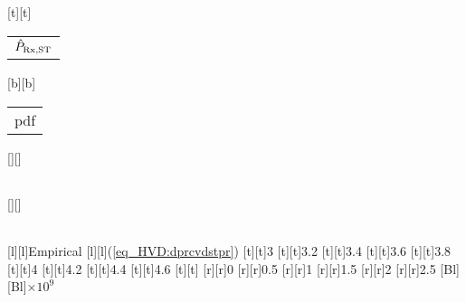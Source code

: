%    
%
%
%
[t][t]{\fontsize{8}{12}\selectfont \color[rgb]{0.15,0.15,0.15}\setlength{\tabcolsep}{0pt}\begin{tabular}{c}$\hat{P}_{\text{Rx,ST}}$\end{tabular}}%
[b][b]{\fontsize{8}{12}\selectfont \color[rgb]{0,0,0}\setlength{\tabcolsep}{0pt}\begin{tabular}{c}pdf\end{tabular}}%
[][]{\fontsize{10}{15}\selectfont \color[rgb]{0,0,0}\setlength{\tabcolsep}{0pt}\begin{tabular}{c} \end{tabular}}%
[][]{\fontsize{10}{15}\selectfont \color[rgb]{0,0,0}\setlength{\tabcolsep}{0pt}\begin{tabular}{c} \end{tabular}}%
[l][l]{\fontsize{8}{12}\selectfont \color[rgb]{0,0,0}Empirical}%
[l][l]{\fontsize{8}{12}\selectfont \color[rgb]{0,0,0}(\ref{eq_HVD:dprcvdstpr})}%
%
\fontsize{8}{12}%
\selectfont%
%
[t][t]{3}%
[t][t]{3.2}%
[t][t]{3.4}%
[t][t]{3.6}%
[t][t]{3.8}%
[t][t]{4}%
[t][t]{4.2}%
[t][t]{4.4}%
[t][t]{4.6}%
[t][t]{}%
%
[r][r]{0}%
[r][r]{0.5}%
[r][r]{1}%
[r][r]{1.5}%
[r][r]{2}%
[r][r]{2.5}%
[Bl][Bl]{$\times 10^{9}$}%
%
%
